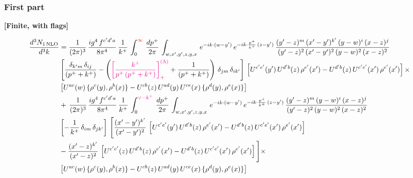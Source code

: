 \documentclass[9pt]{article}
\numberwithin{equation}{section}
\begin{document}
\subsubsection{First part}
\par\smallskip\noindent\textbf{[Finite, with flags]}\par\nobreak
\begin{align}
     \frac{d^{3}N_{1\,\rm NLO}}{d^{3}k} & =  \frac{1}{(2\pi)^{3}}\, \frac{ig^{4}\,f^{c'd'a}}{8\pi^{4}}\, \frac{1}{k^{+}}\,\int_{0}^{{\color{red}\infty}}\,  \frac{dp^{+}}{2\pi}\, \int_{w,x',y',z,y,x}\, e^{-ik\cdot (w-y')}\, e^{-ik\cdot \frac{p^{+}}{k^{+}}\,(z-y')}\,\frac{(y'-z)^{m}\,(x'-y')^{k'}\,(y-w)^{i}\,(x-z)^{j}}{(y'-z)^{2}\,(x'-y')^{2}\,(y-w)^{2}\,(x-z)^{2}}\notag \\ & \left[\frac{\delta_{k'm}\,\delta_{ij}}{(p^{+}+k^{+})}-\left({\color{magenta}\left[\frac{k^{+}}{p^{+}\,(p^{+}+k^{+})}\right]_{+}^{(\Lambda)}}+\frac{1}{(p^{+}+k^{+})}\right)\,\delta_{jm}\,\delta_{ik'}\right]\, \left[U^{c'e'}(y')\,U^{d'b}(z)\,\rho^{e'}(x')-U^{d'b}(z)\,U^{c'e'}(x')\,\rho^{e'}(x')\right]\times\notag \\ &  \left[U^{ac}(w)\, \{\rho^{c}(y),\rho^{b}(x)\}-U^{cb}(z)\,U^{ad}(y)\,U^{ce}(x)\,\{\rho^{d}(y),\rho^{e}(x)\}\right] \notag \\
&  +\,\frac{1}{(2\pi)^{3}}\, \frac{ig^{4}\,f^{c'd'a}}{8\pi^{4}}\, \frac{1}{k^{+}}\,\int_{0}^{{\color{magenta}\vee-k^{+}}}\,  \frac{dp^{+}}{2\pi}\, \int_{w,x',y',z,y,x}\, e^{-ik\cdot (w-y')}\, e^{-ik\cdot \frac{p^{+}}{k^{+}}\,(z-y')}\,\frac{(y'-z)^{m}\,(y-w)^{i}\,(x-z)^{j}}{(y'-z)^{2}\,(y-w)^{2}\,(x-z)^{2}}\notag \\ &   \left[-\frac{1}{k^{+}}\, \delta_{im}\, \delta_{jk'}\right]\, \Bigg[\frac{(x'-y')^{k'}}{(x'-y')^{2}}\,\left[U^{c'e'}(y')\,U^{d'b}(z)\,\rho^{e'}(x')-U^{d'b}(z)\,U^{c'e'}(x')\,\rho^{e'}(x')\right]\notag \\ & -\frac{(x'-z)^{k'}}{(x'-z)^{2}}\,\left[U^{c'e'}(z)\,U^{d'b}(z)\,\rho^{e'}(x')-U^{d'b}(z)\,U^{c'e'}(x')\,\rho^{e'}(x')\right]\Bigg]\times\notag \\ &   \left[U^{ac}(w)\, \{\rho^{c}(y),\rho^{b}(x)\}-U^{cb}(z)\,U^{ad}(y)\,U^{ce}(x)\,\{\rho^{d}(y),\rho^{e}(x)\}\right]
\end{align}
\par{}\par\medskip
\end{document}
